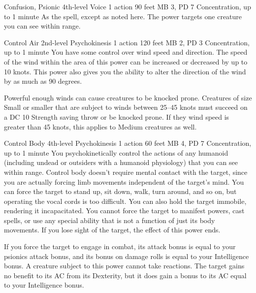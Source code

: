 \DndPowerHeader%
  {Confusion, Psionic}
  {4th-level Voice}
  {1 action}
  {90 feet}
  {MB 3, PD 7}
  {Concentration, up to 1 minute}
As the  spell, except as noted here.
The power targets one creature you can see within range.

\DndPowerHeader%
  {Control Air}
  {2nd-level Psychokinesis}
  {1 action}
  {120 feet}
  {MB 2, PD 3}
  {Concentration, up to 1 minute}
  You have some control over wind speed and direction.
  The speed of the wind within the area of this power
  can be increased or decreased by up to 10 knots.
  This power also gives you the ability to alter the direction
  of the wind by as much as 90 degrees.
  
  Powerful enough winds can cause creatures to be knocked prone.
  Creatures of size Small or smaller that are subject
  to winds between 25--45 knots
  must succeed on a DC 10 Strength saving throw or be knocked prone.
  If they wind speed is greater than 45 knots,
  this applies to Medium creatures as well.

\DndPowerHeader%
  {Control Body}
  {4th-level Psychokinesis}
  {1 action}
  {60 feet}
  {MB 4, PD 7}
  {Concentration, up to 1 minute}
  You psychokinetically control the actions of any humanoid
  (including undead or outsiders with a humanoid physiology)
  that you can see within range.
  Control body doesn't require mental contact with the target,
  since you are actually forcing limb movements independent
  of the target's mind.
  You can force the target to stand up,
  sit down,
  walk,
  turn around,
  and so on,
  but operating the vocal cords is too difficult.
  You can also hold the target immobile,
  rendering it incapacitated.
  You cannot force the target to manifest powers,
  cast spells,
  or use any special ability that is not a function
  of just its body movements.
  If you lose sight of the target,
  the effect of this power ends.

  If you force the target to engage in combat,
  its attack bonus is equal to your
  psionics attack bonus,
  and its bonus on damage rolls is equal
  to your Intelligence bonus.
  A creature subject to this power cannot take reactions.
  The target gains no benefit to its AC from its Dexterity,
  but it does gain a bonus to its AC equal to your Intelligence bonus.
  
